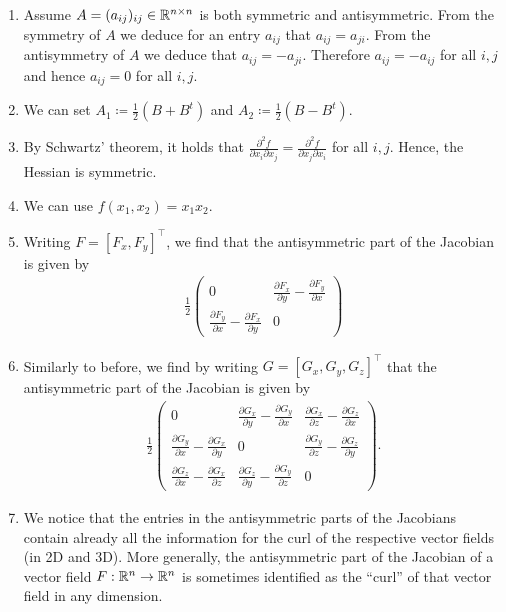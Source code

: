 \documentclass[11pt]{article}
\begin{document}
\begin{solution}
    \begin{enumerate}
     \item Assume $A = (a_{ij})_{ij} \in \mathbb{R}^{n \times n}$ is both symmetric and antisymmetric. From the symmetry of $A$ we deduce for an entry $a_{ij}$ that $a_{ij} = a_{ji}$.
     From the antisymmetry of $A$ we deduce that $a_{ij} = -a_{ji}$.
     Therefore $a_{ij} = -a_{ij}$ for all $i,j$ and hence $a_{ij} = 0$ for all $i,j$.
     \item We can set $A_1 \coloneqq \frac{1}{2}(B + B^{t})$ and $A_2 \coloneqq \frac{1}{2}(B - B^{t})$.
     \item By Schwartz' theorem, it holds that $\frac{\partial^2 f}{\partial x_i \partial x_j} = \frac{\partial^2 f}{\partial x_j \partial x_i}$ for all $i,j$. Hence, the Hessian is symmetric.
     \item We can use $f(x_1,x_2) = x_1 x_2$.
     \item Writing $F = [F_x, F_y]^\top$, we find that the antisymmetric part of the Jacobian is given by
     \begin{align*}
        \frac{1}{2}
            \begin{pmatrix}
                0 & \frac{\partial F_x}{\partial y} -  \frac{\partial F_y}{\partial x}\\
                \frac{\partial F_y}{\partial x} - \frac{\partial F_x}{\partial y} & 0
            \end{pmatrix}
     \end{align*}
     \item Similarly to before, we find by writing $G = [G_x, G_y, G_z]^\top$ that the antisymmetric part of the Jacobian is given by
        \begin{align*}
            \frac{1}{2}
                \begin{pmatrix}
                    0 & \frac{\partial G_x}{\partial y} -  \frac{\partial G_y}{\partial x} & \frac{\partial G_x}{\partial z} -  \frac{\partial G_z}{\partial x}\\
                    \frac{\partial G_y}{\partial x} - \frac{\partial G_x}{\partial y} & 0 & \frac{\partial G_y}{\partial z} -  \frac{\partial G_z}{\partial y}\\
                    \frac{\partial G_z}{\partial x} -  \frac{\partial G_x}{\partial z} & \frac{\partial G_z}{\partial y} -  \frac{\partial G_y}{\partial z} & 0
                \end{pmatrix}.
        \end{align*}
     \item We notice that the entries in the antisymmetric parts of the Jacobians contain already all the information for the curl of the respective vector fields (in 2D and 3D). More generally, the antisymmetric part of the Jacobian of a vector field $F : \mathbb{R}^{n} \rightarrow \mathbb{R}^{n}$ is sometimes identified as the ``curl'' of that vector field in any dimension.
    \end{enumerate}
\end{solution}
\end{document}
